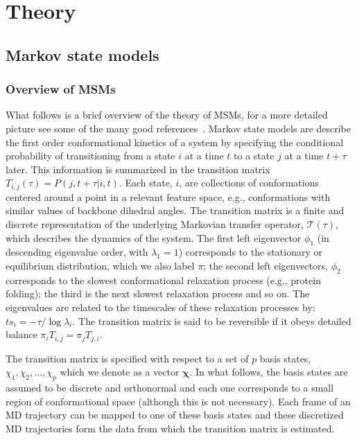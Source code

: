 \documentclass[journal=jacsat,manuscript=article]{achemso}
\begin{document}
\section{Theory}\label{theory}
\subsection{Markov state models}
\subsubsection{Overview of MSMs}

What follows is a brief overview of the theory of MSMs, for a more detailed picture see some of the many good references~\cite{prinz_believe_2011, trendelkamp-schroer_estimation_2015}. Markov state models are describe the first order conformational kinetics of a system by specifying the conditional probability of transitioning from a state $i$ at a time $t$ to a state $j$ at a time $t+\tau$  later. This information is summarized in the transition matrix $T_{i, j}(\tau) = P(j, t+\tau | i, t)$. Each state, $i$, are collections of conformations centered around a point in a relevant feature space, e.g., conformations with similar values of backbone dihedral angles. The transition matrix is a finite and discrete representation of the underlying Markovian transfer operator, $\mathcal{T}(\tau)$, which describes the dynamics of the system. The first left eigenvector $\phi_1$ (in descending eigenvalue order, with $\lambda_{1} = 1$) corresponds to the stationary or equilibrium distribution, which we also label $\pi$; the second left eigenvectors, $\phi_2$ corresponds to the slowest conformational relaxation process (e.g., protein folding); the third is the next slowest relaxation process and so on. The eigenvalues are related to the timescales of these relaxation processes by: $ts_{i} = -\tau/\log{\lambda_i}$.  The transition matrix is said to be reversible if it obeys detailed balance $\pi_i T_{i, j}=\pi_j T_{j, i}$. 

The transition matrix is specified with respect to a set of $p$ basis states, $\chi_1, \chi_2, ..., \chi_p$ which we denote as a vector $\bm{\chi}$. In what follows, the basis states are assumed to be discrete and orthonormal and each one corresponds to a small region of conformational space (although this is not necessary).  Each frame of an MD trajectory can be mapped to one of these basis states and these discretized MD trajectories form the data from which the transition matrix is estimated.
\end{document}
